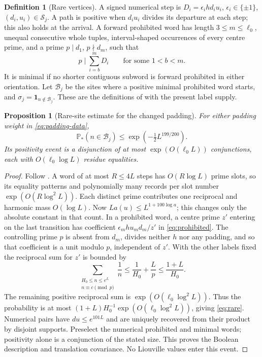 \documentclass[11pt]{article}
\newtheorem{proposition}[theorem]{Proposition}
\theoremstyle{definition}
\newtheorem{definition}[theorem]{Definition}
\newcommand{\Prob}{\mathbb P}
\newcommand{\ind}{\mathbf 1}
\theoremstyle{remark}
\numberwithin{equation}{section}
\begin{document}
\begin{definition}[Rare vertices]\label{def:rare}
A signed numerical step is $D_i=\epsilon_i h d_i u_i$, $\epsilon_i\in\{\pm1\}$, $(d_i,u_i)\in\mathcal S_j$.
A path is positive when $d_i u_i$ divides its departure at each step; this also holds at the arrival.
A forward prohibited word has length $3\le m\le\ell_0$, unequal consecutive whole tuples,
interval-shaped occurrences of every centre prime, and a prime $p\mid d_1$, $p\nmid d_m$, such that
\begin{equation}\label{eq:prohibited}
 p\mid\sum_{i=b}^m D_i\qquad\text{for some }1<b<m.
\end{equation}
It is minimal if no shorter contiguous subword is forward prohibited in either orientation.
Let $\mathcal B_j$ be the sites where a positive minimal prohibited word starts, and $\sigma_j=\ind_{n\notin\mathcal B_j}$.
These are the definitions of \cite[Definition~5.1, pp.~21--22]{OpenAI007} with the present label supply.
\end{definition}

\begin{proposition}[Rare-site estimate for the changed padding]\label{lem:rare}
For either padding weight in \eqref{eq:padding-data},
\begin{equation}\label{eq:rare}
 \Prob_*(n\in\mathcal B_j)\le\exp(-\tfrac12L^{199/200}).
\end{equation}
Its positivity event is a disjunction of at most $\exp(O(\ell_0 L))$ conjunctions, each with
$O(\ell_0\log L)$ residue equalities.
\end{proposition}
\begin{proof}
Follow \cite[Lemmas~5.2--5.3, pp.~22--23]{OpenAI007}. A word of at most $R\le4L$ steps has
$O(R\log L)$ prime slots, so its equality patterns and polynomially many records per slot number
$\exp(O(R\log^2L))$. Each distinct prime contributes one reciprocal and harmonic mass $O(\log L)$.
Now $La(u)\le L^{1+100\log a}$; this changes only the absolute constant in that count.
In a prohibited word, a centre prime $z'$ entering on the last transition has coefficient
$\epsilon_m h u_m d_m/z'$ in \eqref{eq:prohibited}. The controlling prime $p$ is absent from $d_m$, divides
neither $h$ nor any padding, and so that coefficient is a unit modulo $p$, independent of $z'$.
With the other labels fixed the reciprocal sum for $z'$ is bounded by
\begin{equation}\label{eq:elimination}
 \sum_{\substack{H_0\le n\le e^L\\n\equiv c\pmod p}}\frac1n
 \le\frac1{H_0}+\frac Lp\le\frac{1+L}{H_0}.
\end{equation}
The remaining positive reciprocal sum is $\exp(O(\ell_0\log^2L))$.
Thus the probability is at most $(1+L)H_0^{-1}\exp(O(\ell_0\log^2L))$, giving \eqref{eq:rare}.
Numerical pairs have $du\le e^{101L}$ and are uniquely recovered from their product by disjoint supports.
Preselect the numerical prohibited and minimal words; positivity alone is a conjunction of the stated size.
This proves the Boolean description and translation covariance. No Liouville values enter this event.
\end{proof}
\end{document}
